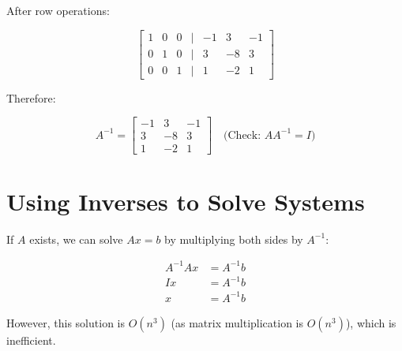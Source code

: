 \documentclass[12pt,a4paper]{article}
\begin{document}
After row operations:

\[
\begin{bmatrix}
1 & 0 & 0 & | & -1 & 3 & -1 \\
0 & 1 & 0 & | & 3 & -8 & 3 \\
0 & 0 & 1 & | & 1 & -2 & 1
\end{bmatrix}
\]

Therefore:

\[A^{-1} = \begin{bmatrix} -1 & 3 & -1 \\ 3 & -8 & 3 \\ 1 & -2 & 1 \end{bmatrix} \quad \text{(Check: $AA^{-1} = I$)}\]

\section{Using Inverses to Solve Systems}

If $A$ exists, we can solve $Ax = b$ by multiplying both sides by $A^{-1}$:

\begin{align*}
A^{-1}Ax &= A^{-1}b \\
Ix &= A^{-1}b \\
x &= A^{-1}b
\end{align*}

However, this solution is $O(n^3)$ (as matrix multiplication is $O(n^3)$), which is inefficient.
\end{document}
